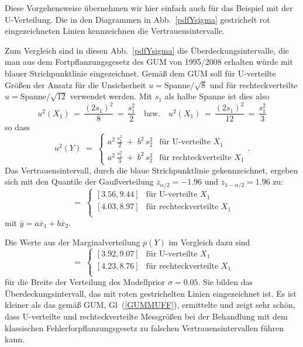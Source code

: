 Diese Vorgehensweise übernehmen wir hier einfach auch für das Beispiel mit der U-Verteilung. Die in den Diagrammen in Abb.~\ref{pdfYsigma} gestrichelt rot
eingezeichneten Linien kennzeichnen die Vertrauensintervalle.

Zum Vergleich sind in diesen Abb.~\ref{pdfYsigma} die Überdeckungsintervalle, die 
man aus dem Fortpflanzungsgesetz des GUM von 1995/2008 erhalten würde mit blauer
Strichpunktlinie eingezeichnet. Gemäß dem GUM soll für U-verteilte
Größen der Ansatz für die Unsicherheit $u = \mathrm{Spanne}/\sqrt{8}$ und für 
rechteckverteilte
$u = \mathrm{Spanne}/\sqrt{12}$ verwendet werden. Mit $s_1$ als halbe Spanne ist dies
also
\begin{equation}
u^2(X_1) \, = \, \frac{(2 s_1)^2}{8} \, = \, \frac{s_1^2}{2} \quad \text{bzw.}
\quad u^2(X_1) \, = \, \frac{(2 s_1)^2}{12} \, = \, \frac{s_1^2}{3}
\end{equation}
so dass
\begin{equation}
\renewcommand{\arraystretch}{1.3}
u^2(Y) \; = \; \left\{\begin{array}{ll}
a^2 \, \frac{s_1^2}{2} \; + \; b^2 \, s_2^2 & \text{für U-verteilte~} X_1\\
a^2 \, \frac{s_1^2}{3} \; + \; b^2 \, s_2^2 & \text{für rechteckverteilte~} X_1
\end{array}\right. .
\label{GUMMUFF}
\end{equation}
Das Vertrauensintervall, durch die blaue Strichpunktlinie gekennzeichnet, ergeben sich mit den Quantile der Gaußverteilung $z_{\alpha/2} = -1.96$ und $z_{1-\alpha/2} = 1.96$ zu: 
\begin{equation}
[\bar y \; - \; 1.96 \, u(Y), \; \bar y \; + \; 1.96 \, u(Y)]
\; = \; \left\{\begin{array}{ll}
[3.56, 9.44] & \text{für U-verteilte~} X_1\\
\left[4.03, 8.97\right] & \text{für rechteckverteilte~} X_1\\
\end{array}\right.
\end{equation}
mit $\bar y = a \bar x_1 + b \bar x_2$.

Die Werte aus der Marginalverteilung $p(Y)$ im Vergleich dazu sind
\begin{equation}
[P^{-1}(\alpha/2), \; P^{-1}(1 - \alpha/2)]
\; = \; \left\{\begin{array}{ll}
[3.92, 9.07] & \text{für U-verteilte~} X_1\\
\left[4.23, 8.76\right] & \text{für rechteckverteilte~} X_1\\
\end{array}\right.
\end{equation}
für die Breite der Verteilung des Modellprior $\sigma = 0.05$. Sie bilden das
Überdeckungsintervall, das mit roten gestrichelten Linien eingezeichnet ist. Es ist kleiner als das gemäß GUM, Gl~(\ref{GUMMUFF}), ermittelte und zeigt sehr schön, dass
U-verteilte und rechteckverteilte Messgrößen bei der Behandlung mit dem klassischen
Fehlerforpflanzungsgesetz zu falschen Vertrauensintervallen führen kann. 
 
